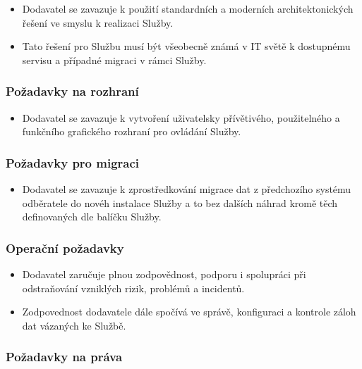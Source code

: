 \documentclass[11pt, a4paper, titlepage]{article}
\begin{document}
	\begin{itemize}
		\item Dodavatel se zavazuje k použití standardních a moderních architektonických řešení ve smyslu k realizaci Služby. 
		\item Tato řešení pro Službu musí být všeobecně známá v IT světě k dostupnému servisu a případné migraci v rámci Služby.
	\end{itemize}

	\subsubsection*{Požadavky na rozhraní}

	\begin{itemize}
		\item Dodavatel se zavazuje k vytvoření uživatelsky přívětivého, použitelného a funkčního grafického rozhraní pro ovládání Služby.
	\end{itemize}

	\subsubsection*{Požadavky pro migraci}

	\begin{itemize}
		\item Dodavatel se zavazuje k zprostředkování migrace dat z předchozího systému odběratele do novéh instalace Služby a to bez dalších náhrad kromě těch definovaných dle balíčku Služby.
	\end{itemize}

	\subsubsection*{Operační požadavky}

	\begin{itemize}
		\item Dodavatel zaručuje plnou zodpovědnost, podporu i spolupráci při odstraňování vzniklých rizik, problémů a incidentů.
		\item Zodpovednost dodavatele dále spočívá ve správě, konfiguraci a kontrole záloh dat vázaných ke Službě.
	\end{itemize}

	\subsubsection*{Požadavky na práva}
\end{document}
